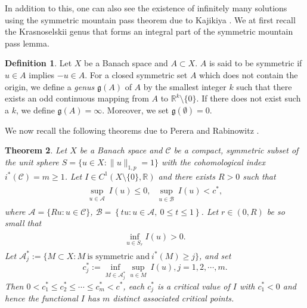 \documentclass[12pt]{extarticle}
\newtheorem{theorem}{Theorem}[section]
\theoremstyle{definition}
\newtheorem{definition}[theorem]{Definition}
\theoremstyle{remark}
\theoremstyle{definition}
\numberwithin{equation}{section}
\numberwithin{equation}{section}
\begin{document}
	
	
	
	In addition to this, one can also see the existence of infinitely many solutions using the symmetric mountain pass theorem due to Kajikiya \cite{Ryuju1}. We at first recall the Krasnoselskii genus that forms an integral part of the symmetric mountain pass lemma. 
	\begin{definition}\label{genus}Let $X$ be a Banach space and $A\subset X$. $A$ is said to be symmetric if $u \in A$ implies $-u \in A$. For a closed symmetric set $A$ which does not contain the origin, we define a {\it genus} $\mathfrak{g}(A)$ of $A$ by the smallest integer $k$ such that there exists an odd continuous mapping from $A$ to $\mathbb{R}^k\setminus\{0\}$. If there does not exist such a $k$, we define $\mathfrak{g}(A)=\infty$. Moreover, we set $\mathfrak{g}(\emptyset) = 0$.
	\end{definition}
	
	
We now recall the following theorems due to Perera \cite{perera2} and Rabinowitz \cite{PR1}.
	\begin{theorem}\label{ACPT1}
	Let $X$ be a Banach space and $\mathcal{C}$ be a compact, symmetric subset of the unit sphere $S=\{u\in X:\|u\|_{1,p}=1\}$ with the cohomological index $i^*(\mathcal{C})=m\geq 1$. Let $ I \in C^1(X \setminus \{0\},\mathbb{R})$ and there exists $R>0$ such that
	\begin{align}\label{2.1}
		\begin{split}
			\underset{u\in \mathcal{A}}\sup~I(u)\leq 0,~~~\underset{u\in \mathcal{B}}\sup~I(u)< c^*,
		\end{split}
	\end{align}
	where $\mathcal{A}=\{Ru:u\in \mathcal{C}\}$, $\mathcal{B}=\left\{tu:u\in \mathcal{A},~0\leq t\leq 1\right\}$. Let $r\in(0,R)$ be so small that 
	\begin{align}\label{2.2}
		\begin{split}
			\underset{u\in S_r}\inf I(u)>0.
		\end{split}
	\end{align}
	Let $\mathcal{A}_j^*:=\{M\subset X:M~\text{is symmetric and}~i^*(M)\geq j\}$, and set $$c_j^*:=\underset{M\in \mathcal{A}_j^*}\inf\underset{u\in M}\sup~I(u), j=1,2,\cdots,m.$$
	Then $ 0 < c_1^*\leq c_2^*\leq\cdots\leq c_m^*<c^*$, each $c_j^*$ is a critical value of $I$ with $c_1^*<0$ and hence the functional $I$ has $m$ distinct associated critical points.
\end{theorem}
\end{document}
